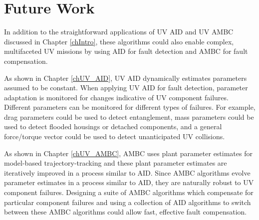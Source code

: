 \section{Future Work}


In addition to the straightforward applications of \ac{UV} \ac{AID}
and \ac{UV} \ac{AMBC} discussed in Chapter \ref{chIntro}, these
algorithms could also enable complex, multifaceted \ac{UV} missions
by using \ac{AID} for fault detection and \ac{AMBC} for fault
compensation.


As shown in Chapter \ref{chUV_AID}, \ac{UV} \ac{AID} dynamically
estimates parameters assumed to be constant.  
%
%
When applying \ac{UV} \ac{AID} for fault detection, 
parameter adaptation is
monitored for changes indicative of \ac{UV} component failures.
%
Different parameters can be monitored for different types of failures.
%
For example, drag parameters could be used to detect entanglement,
mass parameters could be used to detect flooded housings or detached
components, and a general force/torque vector could be used to detect
unanticipated \ac{UV} collisions. 

 
As shown in Chapter \ref{chUV_AMBC}, \ac{AMBC} uses plant parameter
estimates for model-based trajectory-tracking and these plant
parameter estimates are iteratively improved in a process similar to
\ac{AID}.
%
Since \ac{AMBC} algorithms evolve parameter estimates in a process
similar to \ac{AID}, they are naturally robust to \ac{UV} component
failures.
% 
Designing a suite of \ac{AMBC} algorithms which compensate for
particular component failures and using a collection of \ac{AID}
algorithms to switch between these \ac{AMBC} algorithms could allow
fast, effective fault compensation.


